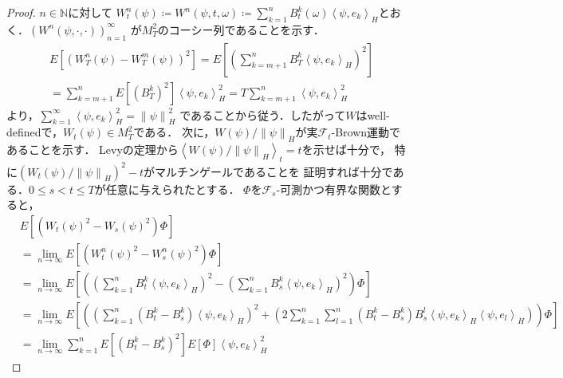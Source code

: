 \documentclass[dvipdfmx,autodetect-engine]{jsarticle}
\theoremstyle{remark}
\theoremstyle{definition}
\newcommand{\N}{\mathbb{N}}
\newcommand{\norm}[1]{\left\lVert#1\right\rVert}
\newcommand{\paren}[1]{\left( #1 \right)}
\newcommand{\iprod}[1]{\left\langle #1 \right\rangle}
\begin{document}
\begin{proof}
    $n\in\N$に対して
    $W^{n}_{t} (\psi) \coloneqq W^{n}(\psi,t,\omega) \coloneqq \sum_{k=1}^{n} B_{t}^{k}(\omega) \iprod{
    \psi, e_{k}}_{H}$とおく．$(W^{n}(\psi,\cdot,\cdot))_{n=1}^{\infty}$
    が$M_{T}^{2}$のコーシー列であることを示す．
    \begin{align}
        &E\left[\paren{W_{T}^{n}(\psi) - W_{T}^{m}(\psi)}^{2}\right]
        = E\left[\paren{\sum_{k=m+1}^{n} B_{T}^{k} \iprod{\psi,e_{k}}_{H} }^{2}\right] \\
        &= \sum_{k=m+1}^{n} E\left[\paren{B_{T}^{k}}^{2}\right] \iprod{\psi,e_{k}}_{H}^{2} 
        = T\sum_{k=m+1}^{n} \iprod{\psi,e_{k}}_{H}^{2}
    \end{align}
    より，$\sum_{k=1}^{\infty} \iprod{\psi,e_{k}}_{H}^{2} = \norm{\psi}_{H}^{2}$
    であることから従う．したがって$W$はwell-definedで，$W_{t}(\psi) \in M_{T}^{2}$である．
    次に，$W(\psi)/\norm{\psi}_{H}$が実$\mathcal{F}_{t}$-Brown運動であることを示す．
    Levyの定理から$\iprod{W(\psi)/\norm{\psi}_{H}}_{t} = t$を示せば十分で，
    特に$\paren{W_{t}(\psi) / \norm{\psi}_{H}}^{2} - t$がマルチンゲールであることを
    証明すれば十分である．$0\leq s<t\leq T$が任意に与えられたとする．
    $\Phi$を$\mathcal{F}_{s}$-可測かつ有界な関数とすると，
    \begin{align}
        &E\left[ \paren{W_{t}(\psi)^{2} - W_{s}(\psi)^{2}}\Phi \right]\\
        &= \lim_{n\to\infty} E\left[\paren{W_{t}^{n}(\psi)^{2} - W_{s}^{n}(\psi)^{2}}\Phi\right]\\
        &= \lim_{n\to\infty} 
            E\left[
                \paren{
            \paren{
                \sum_{k=1}^{n} B_{t}^{k} \iprod{\psi,e_{k}}_{H} 
            }^{2}
             -
            \paren{
                 \sum_{k=1}^{n} B_{s}^{k}\iprod{\psi,e_{k}}_{H} 
            }^{2}
                }\Phi
            \right]\\
        &= \lim_{n\to\infty} 
        E\left[
            \paren{
        \paren{
            \sum_{k=1}^{n} (B_{t}^{k}-B_{s}^{k}) \iprod{\psi,e_{k}}_{H} 
        }^{2}
         +
        \paren{
             2\sum_{k=1}^{n}\sum_{l=1}^{n} (B_{t}^{k} -B_{s}^{k})B_{s}^{l}
             \iprod{\psi,e_{k}}_{H} \iprod{\psi,e_{l}}_{H}
        }
            }\Phi
        \right]\\
        &=\lim_{n\to\infty} 
        \sum_{k=1}^{n} E\left[
        \paren{
            B_{t}^{k}-B_{s}^{k}
        }^{2} 
        \right]
        E\left[ \Phi \right]
        \iprod{\psi,e_{k}}_{H}^{2} 

\end{align}
\end{proof}
\end{document}
